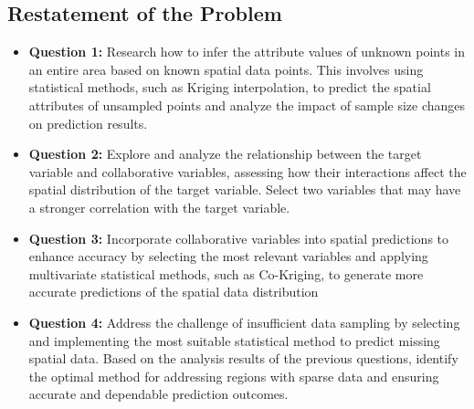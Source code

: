 \documentclass{swmcmthesis}
\begin{document}
\subsection{Restatement of the Problem}
\begin{itemize}
    \item \textbf{Question 1:} 
    Research how to infer the attribute values of unknown points in an entire area based on known spatial data points. This involves using statistical methods, such as Kriging interpolation, to predict the spatial attributes of unsampled points and analyze the impact of sample size changes on prediction results.
    
    \item \textbf{Question 2:} 
    Explore and analyze the relationship between the target variable and collaborative variables, assessing how their interactions affect the spatial distribution of the target variable. Select two variables that may have a stronger correlation with the target variable.
    
    \item \textbf{Question 3:} 
    Incorporate collaborative variables into spatial predictions to enhance accuracy by selecting the most relevant variables and applying multivariate statistical methods, such as Co-Kriging, to generate more accurate predictions of the spatial data distribution
    
    \item \textbf{Question 4:} 
    Address the challenge of insufficient data sampling by selecting and implementing the most suitable statistical method to predict missing spatial data. Based on the analysis results of the previous questions, identify the optimal method for addressing regions with sparse data and ensuring accurate and dependable prediction outcomes.
\end{itemize}
\end{document}

